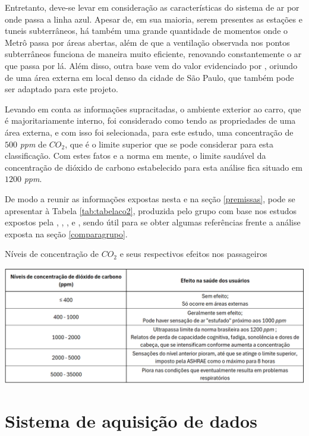 \documentclass[acronym,symbols,table]{fei}
\begin{document}
Entretanto, deve-se levar em consideração as características do sistema de ar por onde passa a linha azul. Apesar de, em sua maioria, serem presentes as estações e tuneis subterrâneos, há também uma grande quantidade de momentos onde o Metrô passa por áreas abertas, além de que a ventilação observada nos pontos subterrâneos funciona de maneira muito eficiente, renovando constantemente o ar que passa por lá. Além disso, outra base vem do valor evidenciado por \textcite{stoco}, oriundo de uma área externa em local denso da cidade de São Paulo, que também pode ser adaptado para este projeto.

Levando em conta as informações supracitadas, o ambiente exterior ao carro, que é majoritariamente interno, foi considerado como tendo as propriedades de uma área externa, e com isso foi selecionada, para este estudo, uma concentração de $500$ \textit{ppm} de ${CO}_{2}$, que é o limite superior que se pode considerar para esta classificação. Com estes fatos e a norma em mente, o limite saudável da concentração de dióxido de carbono estabelecido para esta análise fica situado em $1200$ \textit{ppm}.

De modo a reunir as informações expostas nesta e na seção \ref{premissas}, pode se apresentar à Tabela \ref{tab:tabelaco2}, produzida pelo grupo com base nos estudos expostos pela \textcite{abnt17037}, \textcite{handbook2017ashrae}, \textcite{astmD6245}, \textcite{silvaco2} e \textcite{ashrae2016}, sendo útil para se obter algumas referências frente a análise exposta na seção \ref{comparagrupo}.

\begin{table}[!htb] 
 \centering
    \caption{Níveis de concentração de ${CO}_{2}$ e seus respectivos efeitos nos passageiros}
    \includegraphics[width=0.8\linewidth]{Tabelas/tabela_co2.png}
    \label{tab:tabelaco2}
\end{table}

\section{Sistema de aquisição de dados}
\end{document}
